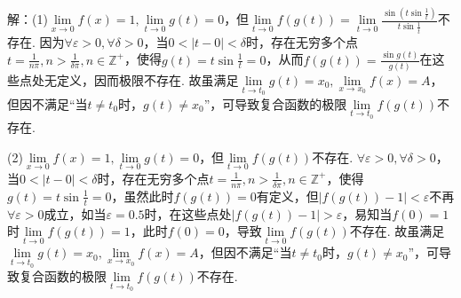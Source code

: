 \documentclass[12pt,UTF8]{ctexart}
\begin{document}
\begin{enumerate}
解：(1)$\lim\limits_{x\rightarrow0}f(x)=1,\lim\limits_{t\rightarrow0}g(t)=0$，但$\lim\limits_{t\rightarrow0}f(g(t))=\lim\limits_{t\rightarrow0}\frac{\sin(t\sin\frac1t)}{t\sin\frac1t}$不存在. 因为$\forall\varepsilon>0,\forall\delta>0$，当$0<|t-0|<\delta$时，存在无穷多个点$t=\frac1{n\pi},n>\frac1{\delta\pi},n\in\mathbb Z^+$，使得$g(t)=t\sin\frac1t=0$，从而$f(g(t))=\frac{\sin g(t)}{g(t)}$在这些点处无定义，因而极限不存在. 故虽满足$\lim\limits_{t\rightarrow t_0}g(t)=x_0,\lim\limits_{x\rightarrow x_0}f(x)=A$，但因不满足“当$t\neq t_0$时，$g(t)\neq x_0$”，可导致复合函数的极限$\lim\limits_{t\rightarrow t_0}f(g(t))$不存在.

(2)$\lim\limits_{x\rightarrow0}f(x)=1,\lim\limits_{t\rightarrow0}g(t)=0$，但$\lim\limits_{t\rightarrow0}f(g(t))$不存在. $\forall\varepsilon>0,\forall\delta>0$，当$0<|t-0|<\delta$时，存在无穷多个点$t=\frac1{n\pi},n>\frac1{\delta\pi},n\in\mathbb Z^+$，使得$g(t)=t\sin\frac1t=0$，虽然此时$f(g(t))=0$有定义，但$|f(g(t))-1|<\varepsilon$不再$\forall\varepsilon>0$成立，如当$\varepsilon=0.5$时，在这些点处$|f(g(t))-1|>\varepsilon$，易知当$f(0)=1$时$\lim\limits_{t\rightarrow0}f(g(t))=1$，此时$f(0)=0$，导致$\lim\limits_{t\rightarrow0}f(g(t))$不存在. 故虽满足$\lim\limits_{t\rightarrow t_0}g(t)=x_0,\lim\limits_{x\rightarrow x_0}f(x)=A$，但因不满足“当$t\neq t_0$时，$g(t)\neq x_0$”，可导致复合函数的极限$\lim\limits_{t\rightarrow t_0}f(g(t))$不存在.
\end{enumerate}
\end{document}
